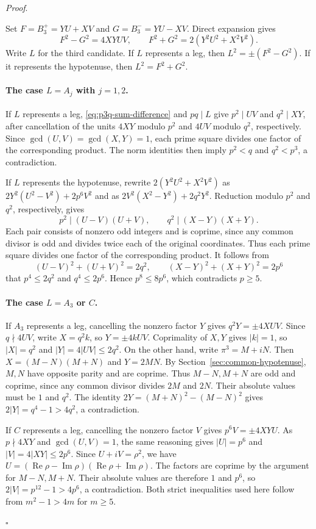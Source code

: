 \documentclass[11pt,a4paper,twoside]{article}
\numberwithin{equation}{section}
\newcommand{\proseheadingstop}{.}
\providecommand{\proofname}{Proof}
\newenvironment{proof}[1][\proofname]{%
  \par\addvspace{.65\baselineskip}\noindent
  \textit{#1}\proseheadingstop\enspace\ignorespaces
}{%
  \unskip\nobreak\hfill\nobreak\(\square\)\par
  \addvspace{.65\baselineskip}
}
\begin{document}
\begin{proof}
Set \(F=B_3^+=YU+XV\) and \(G=B_3^-=YU-XV\). Direct expansion gives
\begin{equation}\label{eq:p3q-sum-difference}
F^2-G^2=4XYUV,\qquad F^2+G^2=2(Y^2U^2+X^2V^2).
\end{equation}
Write \(L\) for the third candidate. If \(L\) represents a leg, then \(L^2=\pm(F^2-G^2)\). If it represents the hypotenuse, then \(L^2=F^2+G^2\).

\paragraph{The case \(L=A_j\) with \(j=1,2\).}
If \(L\) represents a leg, \eqref{eq:p3q-sum-difference} and \(pq\mid L\) give \(p^2\mid UV\) and \(q^2\mid XY\), after cancellation of the units \(4XY\) modulo \(p^2\) and \(4UV\) modulo \(q^2\), respectively. Since \(\gcd(U,V)=\gcd(X,Y)=1\), each prime square divides one factor of the corresponding product. The norm identities then imply \(p^2<q\) and \(q^2<p^3\), a contradiction.

If \(L\) represents the hypotenuse, rewrite \(2(Y^2U^2+X^2V^2)\) as \(2Y^2(U^2-V^2)+2p^6V^2\) and as \(2V^2(X^2-Y^2)+2q^2Y^2\). Reduction modulo \(p^2\) and \(q^2\), respectively, gives
\[
p^2\mid(U-V)(U+V),\qquad q^2\mid(X-Y)(X+Y).
\]
Each pair consists of nonzero odd integers and is coprime, since any common divisor is odd and divides twice each of the original coordinates. Thus each prime square divides one factor of the corresponding product. It follows from
\[
(U-V)^2+(U+V)^2=2q^2,\qquad
(X-Y)^2+(X+Y)^2=2p^6
\]
that \(p^4\le2q^2\) and \(q^4\le2p^6\). Hence \(p^8\le8p^6\), which contradicts \(p\ge5\).

\paragraph{The case \(L=A_3\) or \(C\).}
If \(A_3\) represents a leg, cancelling the nonzero factor \(Y\) gives \(q^2Y=\pm4XUV\). Since \(q\nmid4UV\), write \(X=q^2k\), so \(Y=\pm4kUV\). Coprimality of \(X,Y\) gives \(|k|=1\), so \(|X|=q^2\) and \(|Y|=4|UV|\le2q^2\). On the other hand, write \(\pi^3=M+iN\). Then \(X=(M-N)(M+N)\) and \(Y=2MN\). By Section~\ref{sec:common-hypotenuse}, \(M,N\) have opposite parity and are coprime. Thus \(M-N,M+N\) are odd and coprime, since any common divisor divides \(2M\) and \(2N\). Their absolute values must be \(1\) and \(q^2\). The identity \(2Y=(M+N)^2-(M-N)^2\) gives \(2|Y|=q^4-1>4q^2\), a contradiction.

If \(C\) represents a leg, cancelling the nonzero factor \(V\) gives \(p^6V=\pm4XYU\). As \(p\nmid4XY\) and \(\gcd(U,V)=1\), the same reasoning gives \(|U|=p^6\) and \(|V|=4|XY|\le2p^6\). Since \(U+iV=\rho^2\), we have \(U=(\operatorname{Re}\rho-\operatorname{Im}\rho)(\operatorname{Re}\rho+\operatorname{Im}\rho)\). The factors are coprime by the argument for \(M-N,M+N\). Their absolute values are therefore \(1\) and \(p^6\), so \(2|V|=p^{12}-1>4p^6\), a contradiction. Both strict inequalities used here follow from \(m^2-1>4m\) for \(m\ge5\).


\end{proof}
\end{document}
